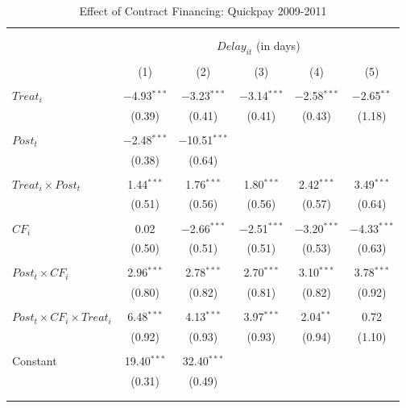 \documentclass[]{article}
\begin{document}
\begin{table}[H] \centering 
  \caption{Effect of Contract Financing: Quickpay 2009-2011} 
  \label{} 
\small 
\begin{tabular}{@{\extracolsep{-2pt}}lccccc} 
\\[-1.8ex]\hline 
\hline \\[-1.8ex] 
\\[-1.8ex] & \multicolumn{5}{c}{$Delay_{it}$ (in days)} \\ 
\\[-1.8ex] & (1) & (2) & (3) & (4) & (5)\\ 
\hline \\[-1.8ex] 
 $Treat_i$ & $-$4.93$^{***}$ & $-$3.23$^{***}$ & $-$3.14$^{***}$ & $-$2.58$^{***}$ & $-$2.65$^{**}$ \\ 
  & (0.39) & (0.41) & (0.41) & (0.43) & (1.18) \\ 
  & & & & & \\ 
 $Post_t$ & $-$2.48$^{***}$ & $-$10.51$^{***}$ &  &  &  \\ 
  & (0.38) & (0.64) &  &  &  \\ 
  & & & & & \\ 
 $Treat_i \times Post_t$ & 1.44$^{***}$ & 1.76$^{***}$ & 1.80$^{***}$ & 2.42$^{***}$ & 3.49$^{***}$ \\ 
  & (0.51) & (0.56) & (0.56) & (0.57) & (0.64) \\ 
  & & & & & \\ 
 $CF_i$ & 0.02 & $-$2.66$^{***}$ & $-$2.51$^{***}$ & $-$3.20$^{***}$ & $-$4.33$^{***}$ \\ 
  & (0.50) & (0.51) & (0.51) & (0.53) & (0.63) \\ 
  & & & & & \\ 
 $Post_t \times CF_i$ & 2.96$^{***}$ & 2.78$^{***}$ & 2.70$^{***}$ & 3.10$^{***}$ & 3.78$^{***}$ \\ 
  & (0.80) & (0.82) & (0.81) & (0.82) & (0.92) \\ 
  & & & & & \\ 
 $Post_t \times CF_i \times Treat_i$ & 6.48$^{***}$ & 4.13$^{***}$ & 3.97$^{***}$ & 2.04$^{**}$ & 0.72 \\ 
  & (0.92) & (0.93) & (0.93) & (0.94) & (1.10) \\ 
  & & & & & \\ 
 Constant & 19.40$^{***}$ & 32.40$^{***}$ &  &  &  \\ 
  & (0.31) & (0.49) &  &  &  \\ 
  & & & & & \\ 
\hline \\[-1.8ex] 

\end{tabular}
\end{table}
\end{document}
